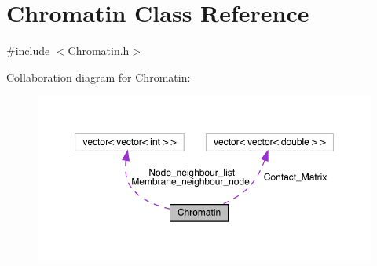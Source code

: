 \hypertarget{classChromatin}{}\section{Chromatin Class Reference}
\label{classChromatin}


{\ttfamily \#include $<$Chromatin.\+h$>$}



Collaboration diagram for Chromatin\+:
\nopagebreak
\begin{figure}[H]
\begin{center}
\leavevmode
\includegraphics[width=350pt]{classChromatin__coll__graph}
\end{center}
\end{figure}
